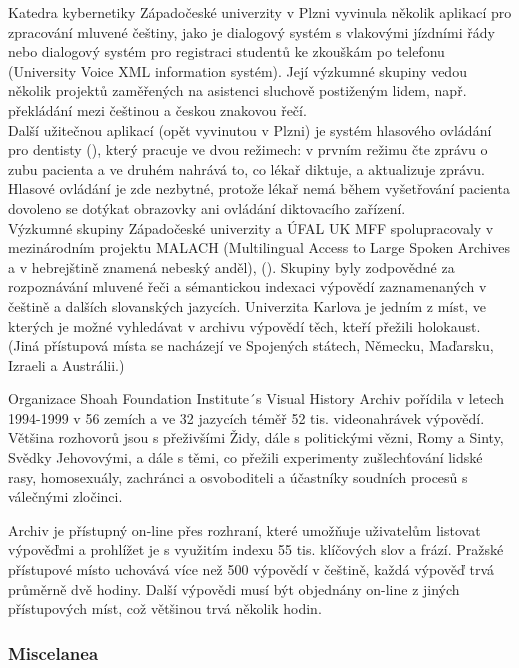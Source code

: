 \documentclass[]{../../metanetpaper}
\begin{document}
\begin{multicols}{2}
Katedra kybernetiky Západočeské univerzity v Plzni vyvinula několik aplikací pro zpracování mluvené češtiny, jako je dialogový systém s vlakovými jízdními řády nebo dialogový systém pro registraci studentů ke zkouškám po telefonu (University Voice XML information systém).\cite{Note24} Její výzkumné skupiny vedou několik projektů zaměřených na asistenci sluchově postiženým lidem, např. překládání mezi češtinou a českou znakovou řečí.\\
Další užitečnou aplikací (opět vyvinutou v Plzni) je systém hlasového ovládání pro dentisty (\cite{Nagy2008}), který pracuje ve dvou režimech: v prvním režimu čte zprávu o zubu pacienta a ve druhém nahrává to, co lékař diktuje, a aktualizuje zprávu. Hlasové ovládání je zde nezbytné, protože lékař nemá během vyšetřování pacienta dovoleno se dotýkat obrazovky ani ovládání diktovacího zařízení.\\
Výzkumné skupiny Západočeské univerzity a ÚFAL UK MFF spolupracovaly v mezinárodním projektu MALACH (Multilingual Access to Large Spoken Archives a v hebrejštině znamená nebeský anděl), (\cite{Psutka2005}). Skupiny byly zodpovědné za rozpoznávání mluvené řeči a sémantickou indexaci výpovědí zaznamenaných v češtině a dalších slovanských jazycích. Univerzita Karlova je jedním z míst, ve kterých je možné vyhledávat v archivu výpovědí těch, kteří přežili holokaust. (Jiná přístupová místa se nacházejí ve Spojených státech, Německu, Maďarsku, Izraeli a Austrálii.)

Organizace Shoah Foundation Institute´s Visual History Archiv pořídila v letech 1994-1999 v 56 zemích a ve 32 jazycích téměř 52 tis. videonahrávek výpovědí. Většina rozhovorů jsou s přeživšími Židy, dále s politickými vězni, Romy a Sinty, Svědky Jehovovými, a dále s těmi, co přežili experimenty zušlechťování lidské rasy, homosexuály, zachránci a osvoboditeli a účastníky soudních procesů s válečnými zločinci.

Archiv je přístupný on-line přes rozhraní, které umožňuje uživatelům listovat výpověďmi a prohlížet je s využitím indexu 55 tis. klíčových slov a  frází. Pražské přístupové místo uchovává více než 500 výpovědí v češtině, každá výpověď trvá průměrně dvě hodiny. Další výpovědi musí být objednány on-line z jiných přístupových míst, což většinou trvá několik hodin.

\subsubsection{Miscelanea}


\end{multicols}
\end{document}
